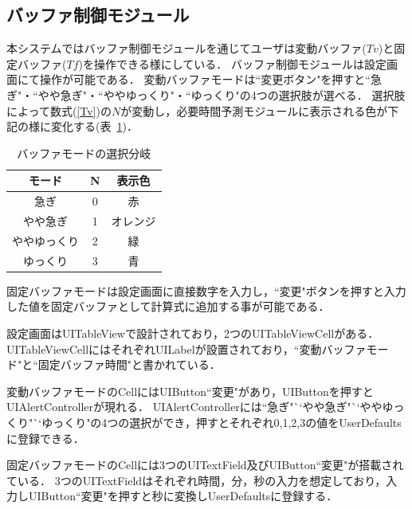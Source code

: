 \subsection{バッファ制御モジュール}
本システムではバッファ制御モジュールを通じてユーザは変動バッファ($Tv$)と固定バッファ($Tf$)を操作できる様にしている．
バッファ制御モジュールは設定画面にて操作が可能である．
変動バッファモードは``変更ボタン"を押すと``急ぎ"・``やや急ぎ"・``ややゆっくり"・``ゆっくり"の4つの選択肢が選べる．
選択肢によって数式(\ref{Tv})の$N$が変動し，必要時間予測モジュールに表示される色が下記の様に変化する(表~\ref{tb:buffer})．
\begin{table}[htb]
  \begin{center}
  \caption{バッファモードの選択分岐}
  \begin{tabular}{|c|c|c|} \hline
    モード & N & 表示色  \\ \hline \hline
    急ぎ & 0 & 赤  \\ \hline
    やや急ぎ & 1 & オレンジ  \\ \hline
    ややゆっくり & 2 & 緑  \\ \hline
    ゆっくり & 3 & 青  \\ \hline
  \end{tabular}
    \label{tb:buffer}
  \end{center}
\end{table}
固定バッファモードは設定画面に直接数字を入力し，``変更"ボタンを押すと入力した値を固定バッファとして計算式に追加する事が可能である．

設定画面はUITableViewで設計されており，2つのUITableViewCellがある．
UITableViewCellにはそれぞれUILabelが設置されており，``変動バッファモード"と``固定バッファ時間"と書かれている．

変動バッファモードのCellにはUIButton``変更"があり，UIButtonを押すとUIAlertControllerが現れる．
UIAlertControllerには``急ぎ"``やや急ぎ"``ややゆっくり"``ゆっくり"の4つの選択ができ，押すとそれぞれ0,1,2,3の値をUserDefaultsに登録できる．

固定バッファモードのCellには3つのUITextField及びUIButton``変更"が搭載されている．
3つのUITextFieldはそれぞれ時間，分，秒の入力を想定しており，入力しUIButton``変更"を押すと秒に変換しUserDefaultsに登録する．


